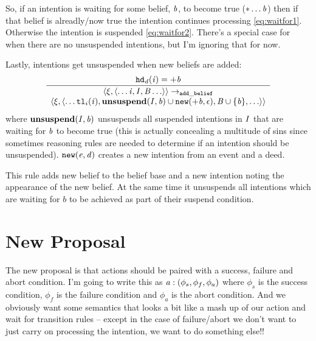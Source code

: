 \documentclass{blue-book}
\begin{document}
So, if an intention is waiting for some belief, $\mathit{b}$, to become true ($*\ldots{\ensuremath{\mathit{b}}}$) then if that belief is alreadly/now true the intention continues processing \eqref{eq:waitfor1}.  Otherwise
the intention is suspended \eqref{eq:waitfor2}.   There's a special case for when there are no unsuspended intentions, but I'm ignoring that for now.

Lastly, intentions get unsuspended when new beliefs are added:
\begin{equation}
\frac{\mathit{{\tt hd}_d}(\mathit{i})  = +\mathit{b}
}{
\begin{array}{c}
\langle \xi, \langle \ldots \mathit{i}, \mathit{I}, \mathit{B} \ldots \rangle \rangle \rightarrow_{\tt add\_belief} \\
\langle \xi, \langle \ldots
{\tt tl}_i(\mathit{i}) , 
\bf unsuspend(\mathit{I}, \mathit{b}) \cup {\tt new}(\mathit{+\mathit{b}}, \epsilon), 
\mathit{B} \cup \{\mathit{b}\}, \ldots \rangle \rangle
\end{array}
}
\end{equation}
where $\bf unsuspend(\mathit{I}, \mathit{b})$ unsuspends all suspended intentions in $\mathit{I}$ that are waiting for $\mathit{b}$ to become true (this is actually concealing a multitude of sins since sometimes reasoning rules are needed to determine if an intention should be unsuspended).  ${\tt new}(\mathit{e}, \mathit{d})$ creates a new intention from an event and a deed. 

This rule adds new belief to the belief base and a new intention noting the appearance of the new belief.  At the same time it unsuspends all intentions which are waiting for $b$ to be achieved as part of their suspend condition.

\section{New Proposal}

\newcommand{\newaction}[4]{\ensuremath{#1:(#2,#3,#4)}}

The new proposal is that actions should be paired with a success, failure and abort condition.  I'm going to write this as $\newaction{\AILaction}{\phi_s}{\phi_f}{\phi_a}$ where $\phi_s$ is the success condition, $\phi_f$ is the failure condition and $\phi_a$ is the abort condition.  And we obviously want some semantics that looks a bit like a mash up of our action and wait for transition rules -- except in the case of failure/abort we don't want to just carry on processing the intention, we want to do something else!!
\end{document}
